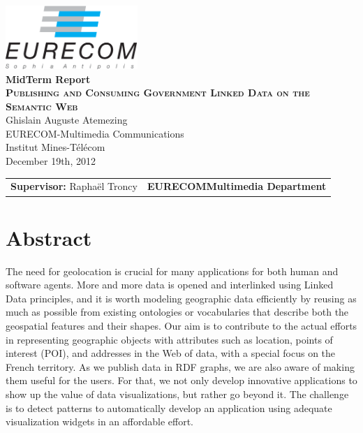 \documentclass[a4paper,11pt]{report}
\begin{document}
\begin{titlepage}
\begin{center}
\includegraphics[width=5cm]{EURECOM_logo_quadri}
\\[3cm]
\textbf{\Huge{MidTerm Report}}
\\[4cm]
\textbf{\textsc{\LARGE{Publishing and Consuming Government Linked Data on the Semantic Web}}}
\\[0.5cm]
\LARGE{Ghislain Auguste Atemezing}
\\[0.5cm]
\small{EURECOM-Multimedia Communications}
\\
\large{Institut Mines-T\'{e}l\'{e}com}
\\
\large{December 19th, 2012}
\\[5cm]
\begin{tabular}{p{8cm} p{8.5cm}}
\small{\textbf{Supervisor:}\newline
Rapha\"el Troncy} 
&
\small{\textbf{EURECOM\newline Multimedia Department}}
\end{tabular}
\end{center}
\end{titlepage}

 \tableofcontents


\chapter*{Abstract}

The need for geolocation is crucial for many applications for both human and software agents. More and more data is opened and interlinked using Linked Data principles, and it is worth modeling geographic data efficiently by reusing as much as possible from existing ontologies or vocabularies that describe both the geospatial features and their shapes. Our aim is to contribute to the actual efforts in representing geographic objects with attributes such as location, points of interest (POI), and addresses in the Web of data, with a special focus on the French territory.
As we publish data in RDF graphs, we are also aware of making them useful for the users. For that, we not only develop innovative applications to show up the value of data visualizations, but rather go beyond it. The challenge is to detect patterns to automatically develop an application using adequate visualization widgets in an affordable effort.  
\end{document}
